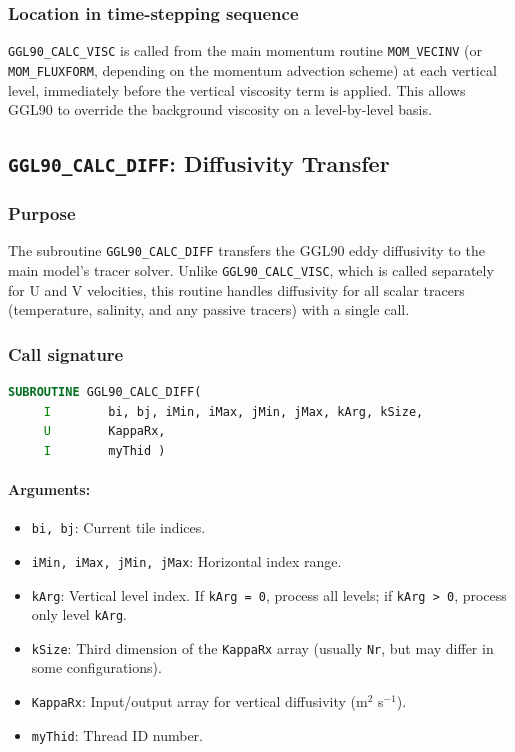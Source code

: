 \documentclass[12pt,letterpaper]{article}
\begin{document}
\subsubsection{Location in time-stepping sequence}

\verb|GGL90_CALC_VISC| is called from the main momentum routine \verb|MOM_VECINV| (or \verb|MOM_FLUXFORM|, depending on the momentum advection scheme) at each vertical level, immediately before the vertical viscosity term is applied. This allows GGL90 to override the background viscosity on a level-by-level basis.

\subsection{\texttt{GGL90\_CALC\_DIFF}: Diffusivity Transfer}
\label{sec:diff_transfer}

\subsubsection{Purpose}

The subroutine \verb|GGL90_CALC_DIFF| transfers the GGL90 eddy diffusivity to the main model's tracer solver. Unlike \verb|GGL90_CALC_VISC|, which is called separately for U and V velocities, this routine handles diffusivity for all scalar tracers (temperature, salinity, and any passive tracers) with a single call.

\subsubsection{Call signature}

\begin{lstlisting}[language=Fortran,caption={(ggl90\_calc\_diff.F:L7--10) Subroutine interface}]
      SUBROUTINE GGL90_CALC_DIFF(
     I        bi, bj, iMin, iMax, jMin, jMax, kArg, kSize,
     U        KappaRx,
     I        myThid )
\end{lstlisting}

\paragraph{Arguments:}
\begin{itemize}
\item \verb|bi, bj|: Current tile indices.
\item \verb|iMin, iMax, jMin, jMax|: Horizontal index range.
\item \verb|kArg|: Vertical level index. If \verb|kArg = 0|, process all levels; if \verb|kArg > 0|, process only level \verb|kArg|.
\item \verb|kSize|: Third dimension of the \verb|KappaRx| array (usually \verb|Nr|, but may differ in some configurations).
\item \verb|KappaRx|: Input/output array for vertical diffusivity (m$^2$ s$^{-1}$).
\item \verb|myThid|: Thread ID number.
\end{itemize}
\end{document}
